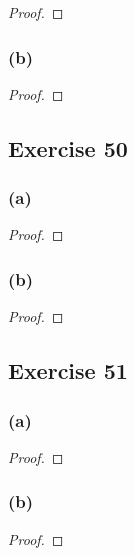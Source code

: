 \documentclass[14pt]{extarticle}
\begin{document}
\begin{proof}

\end{proof}

\subsubsection{(b)}

\begin{proof}

\end{proof}

\subsection{Exercise 50}

\subsubsection{(a)}

\begin{proof}

\end{proof}

\subsubsection{(b)}

\begin{proof}

\end{proof}

\subsection{Exercise 51}

\subsubsection{(a)}

\begin{proof}

\end{proof}

\subsubsection{(b)}

\begin{proof}

\end{proof}
\end{document}
